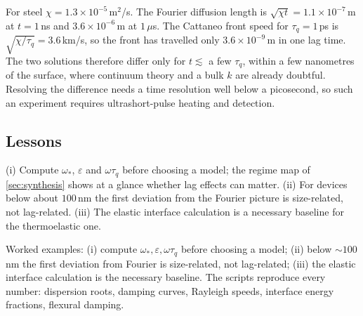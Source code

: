 For steel $\chi=1.3\times10^{-5}$\,m$^2$/s. The Fourier diffusion length is $\sqrt{\chi t}=1.1\times10^{-7}$\,m at $t=1$\,ns and $3.6\times10^{-6}$\,m at $1\,\mu$s. The Cattaneo front speed for $\tau_q=1$\,ps is $\sqrt{\chi/\tau_q}=3.6$\,km/s, so the front has travelled only $3.6\times10^{-9}$\,m in one lag time. The two solutions therefore differ only for $t\lesssim$ a few $\tau_q$, within a few nanometres of the surface, where continuum theory and a bulk $k$ are already doubtful. Resolving the difference needs a time resolution well below a picosecond, so such an experiment requires ultrashort-pulse heating and detection.

\subsection{Lessons}
(i) Compute $\omega_*$, $\varepsilon$ and $\omega\tau_q$ before choosing a model; the regime map of \cref{sec:synthesis} shows at a glance whether lag effects can matter. (ii) For devices below about $100$\,nm the first deviation from the Fourier picture is size-related, not lag-related. (iii) The elastic interface calculation is a necessary baseline for the thermoelastic one.


\begin{summarybox}[Summary]
Worked examples: (i) compute $\omega_*,\varepsilon,\omega\tau_q$ before choosing a model; (ii) below $\sim100$\,nm the first deviation from Fourier is size-related, not lag-related; (iii) the elastic interface calculation is the necessary baseline. The scripts reproduce every number: dispersion roots, damping curves, Rayleigh speeds, interface energy fractions, flexural damping.
\end{summarybox}